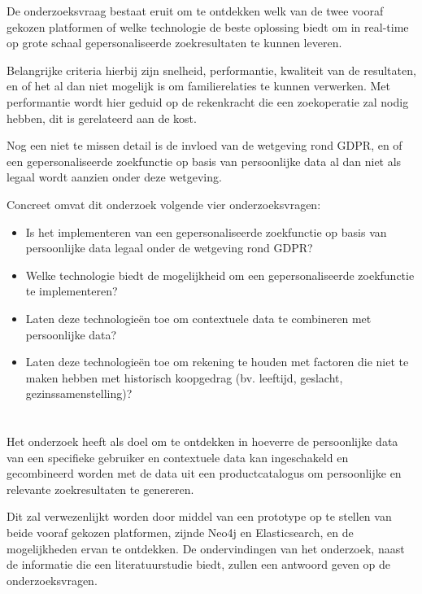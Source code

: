 De onderzoeksvraag bestaat eruit om te ontdekken welk van de twee vooraf gekozen platformen of welke technologie de beste oplossing biedt om in real-time op grote schaal gepersonaliseerde zoekresultaten te kunnen leveren.

Belangrijke criteria hierbij zijn snelheid, performantie, kwaliteit van de resultaten, en of het al dan niet mogelijk is om familierelaties te kunnen verwerken. Met performantie wordt hier geduid op de rekenkracht die een zoekoperatie zal nodig hebben, dit is gerelateerd aan de kost. 

Nog een niet te missen detail is de invloed van de wetgeving rond GDPR, en of een gepersonaliseerde zoekfunctie op basis van persoonlijke data al dan niet als legaal wordt aanzien onder deze wetgeving.

Concreet omvat dit onderzoek volgende vier onderzoeksvragen:
\begin{itemize}
	\item Is het implementeren van een gepersonaliseerde zoekfunctie op basis van persoonlijke data legaal onder de wetgeving rond GDPR?
	\item Welke technologie biedt de mogelijkheid om een gepersonaliseerde zoekfunctie te implementeren?
	\item Laten deze technologieën toe om contextuele data te combineren met persoonlijke data?
	\item Laten deze technologieën toe om rekening te houden met factoren die niet te maken hebben met historisch koopgedrag (bv. leeftijd, geslacht, gezinssamenstelling)?
\end{itemize} 

\section{}
\label{sec:onderzoeksdoelstelling}

Het onderzoek heeft als doel om te ontdekken in hoeverre de persoonlijke data van een specifieke gebruiker en contextuele data kan ingeschakeld en gecombineerd worden met de data uit een productcatalogus om persoonlijke en relevante zoekresultaten te genereren.

Dit zal verwezenlijkt worden door middel van een prototype op te stellen van beide vooraf gekozen platformen, zijnde Neo4j en Elasticsearch, en de mogelijkheden ervan te ontdekken. De ondervindingen van het onderzoek, naast de informatie die een literatuurstudie biedt, zullen een antwoord geven op de onderzoeksvragen.


